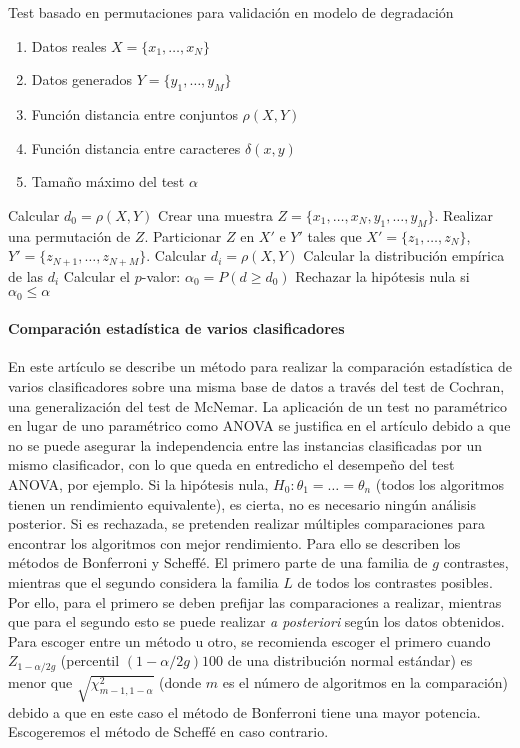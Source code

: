 \begin{algorithm}
	\caption{Test basado en permutaciones para validación en 
			modelo de degradación}
	\label{alg:CMC-digitalizacion}
	\begin{algorithmic}[1]
	\REQUIRE
		\begin{enumerate}[a]
		\item Datos reales $X = \{ x_1, \dots, x_N \}$
		\item Datos generados $Y = \{ y_1, \dots, y_M \}$
		\item Función distancia entre conjuntos $\rho(X,Y)$
		\item Función distancia entre caracteres $\delta(x,y)$
		\item Tamaño máximo del test $\alpha$
		\end{enumerate}
		\STATE Calcular $d_0 = \rho(X,Y)$
		\STATE Crear una muestra 
			$Z= \{x_1, \dots, x_N, y_1, \dots, y_M \}$.
			\STATE Realizar una permutación de $Z$.
			\STATE Particionar $Z$ en $X'$ e $Y'$ tales que 
				$X' = \{ z_1, \dots, z_N \}$, $Y' = 
				\{ z_{N+1}, \dots, z_{N+M} \} $.
			\STATE Calcular $d_i = \rho(X,Y)$
		\ENDFOR
		\STATE Calcular la distribución empírica de las $d_i$
		\STATE Calcular el $p$-valor: 
			$\alpha_0 = P(d \geq d_0)$
		\STATE Rechazar la hipótesis nula si 
			$\alpha_0 \leq \alpha$
	\end{algorithmic}
\end{algorithm}

	
\paragraph{Comparación estadística de varios clasificadores} 
\cite{CHENGCHEN03} En este artículo se describe un método 
para realizar la comparación estadística de varios 
clasificadores sobre una misma base de datos a través del 
test de Cochran, una generalización del test de McNemar. La 
aplicación de un test no paramétrico en lugar de uno 
paramétrico como ANOVA se justifica en el artículo debido a 
que no se puede asegurar la independencia entre las 
instancias clasificadas por un mismo clasificador, con lo que 
queda en entredicho el desempeño del test ANOVA, por ejemplo. 
Si la hipótesis nula, $H_0: \theta_1 = \dots = \theta_n$ 
(todos los algoritmos tienen un rendimiento equivalente), es 
cierta, no es necesario ningún análisis posterior. Si es 
rechazada, se pretenden realizar múltiples comparaciones para 
encontrar los algoritmos con mejor rendimiento. Para ello se 
describen los métodos de Bonferroni y Scheffé. El primero 
parte de una familia de $g$ contrastes, mientras que el 
segundo considera la familia $L$ de todos los contrastes 
posibles. Por ello, para el primero se deben prefijar las 
comparaciones a realizar, mientras que para el segundo esto 
se puede realizar \textit{a posteriori} según los datos 
obtenidos. Para escoger entre un método u otro, se recomienda 
escoger el primero cuando $Z_{1-\alpha/2g}$ (percentil $(1-
\alpha/2g)100$ de una distribución normal estándar) es menor 
que $\sqrt{\chi^2_{m-1,1-\alpha}}$ (donde $m$ es el número de 
algoritmos en la comparación) debido a que en este caso el 
método de Bonferroni tiene una mayor potencia. Escogeremos el 
método de Scheffé en caso contrario.

